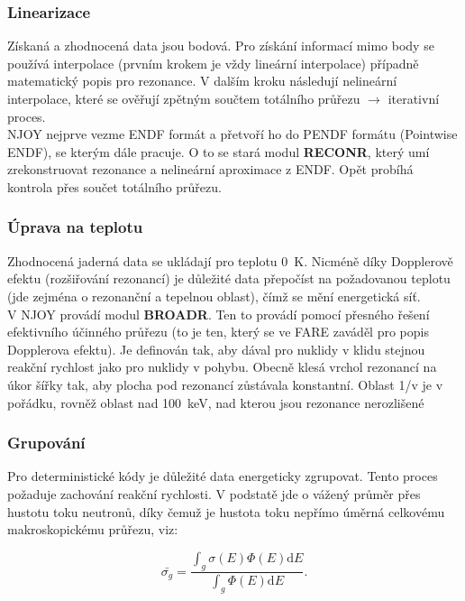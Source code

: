 \subsubsection{Linearizace}

Získaná a zhodnocená data jsou bodová. Pro získání informací mimo body se používá interpolace (prvním krokem je vždy lineární interpolace) případně matematický popis pro rezonance. V dalším kroku následují nelineární interpolace, které se ověřují zpětným součtem totálního průřezu $\rightarrow$ iterativní proces.\\

NJOY nejprve vezme ENDF formát a přetvoří ho do PENDF formátu (Pointwise ENDF), se kterým dále pracuje. O to se stará modul \textbf{RECONR}, který umí zrekonstruovat rezonance a nelineární aproximace z ENDF. Opět probíhá kontrola přes součet totálního průřezu.

\subsubsection{Úprava na teplotu}

Zhodnocená jaderná data se ukládají pro teplotu 0~K. Nicméně díky Dopplerově efektu (rozšiřování rezonancí) je důležité data přepočíst na požadovanou teplotu (jde zejména o rezonanční a tepelnou oblast), čímž se mění energetická síť.\\

V NJOY provádí modul \textbf{BROADR}. Ten to provádí pomocí přesného řešení efektivního účinného průřezu (to je ten, který se ve FARE zaváděl pro popis Dopplerova efektu). Je definován tak, aby dával pro nuklidy v klidu stejnou reakční rychlost jako pro nuklidy v pohybu. Obecně klesá vrchol rezonancí na úkor šířky tak, aby plocha pod rezonancí zůstávala konstantní. Oblast 1/v je v pořádku, rovněž oblast nad 100~keV, nad kterou jsou rezonance nerozlišené

\subsubsection{Grupování}

Pro deterministické kódy je důležité data energeticky zgrupovat. Tento proces požaduje zachování reakční rychlosti. V podstatě jde o vážený průměr přes hustotu toku neutronů, díky čemuž je hustota toku nepřímo úměrná celkovému makroskopickému průřezu, viz:

\begin{equation}
  \boxed{
    \bar{\sigma_g} = \dfrac{\int_g \sigma(E) \Phi(E) \text{d}E}{\int_g \Phi(E) \text{d}E}.}
    \label{grupovani}
\end{equation}

